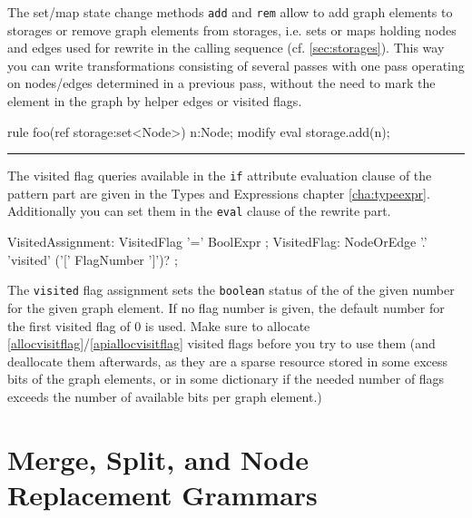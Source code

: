 \begin{example}
The set/map state change methods \texttt{add} and \texttt{rem} allow to add graph elements to storages or remove graph elements from storages, i.e. sets or maps holding nodes and edges used for rewrite in the calling sequence (cf. \ref{sec:storages}).
This way you can write transformations consisting of several passes with one pass operating on nodes/edges determined in a previous pass,
without the need to mark the element in the graph by helper edges or visited flags.
	\begin{grgen}
rule foo(ref storage:set<Node>)
{
  n:Node;
  modify {
    eval {
      storage.add(n);
    }
  }
}  
	\end{grgen}
\end{example}

\vspace{5mm}
\hrule
\vspace{5mm}

The visited flag queries available in the \texttt{if} attribute evaluation clause of the pattern part are given in the Types and Expressions chapter \ref{cha:typeexpr}.
Additionally you can set them in the \texttt{eval} clause of the rewrite part.

\begin{rail}    
  VisitedAssignment:
    VisitedFlag '=' BoolExpr
	;
	VisitedFlag:
    NodeOrEdge '.' 'visited' ('[' FlagNumber ']')?
  ;
\end{rail}

The \texttt{visited} flag assignment sets the \texttt{boolean} status of the  of the given number for the given graph element.
If no flag number is given, the default number for the first visited flag of 0 is used.
Make sure to allocate \ref{allocvisitflag}/\ref{apiallocvisitflag} visited flags before you try to use them 
(and deallocate them afterwards, as they are a sparse resource stored in some excess bits of the graph elements, or in some dictionary if the needed number of flags exceeds the number of available bits per graph element.)


\section{Merge, Split, and Node Replacement Grammars}\label{sub:mergesplit}

